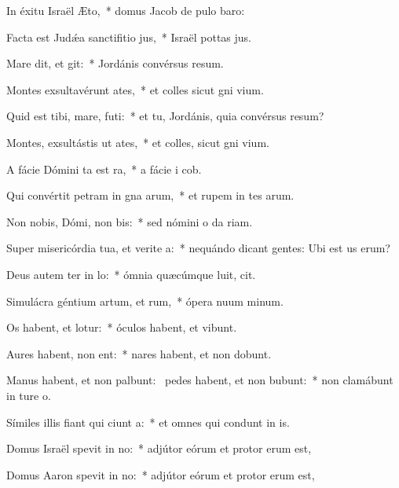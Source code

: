 \item In éxitu Israël  Æto,~* domus Jacob de pulo baro:
\item Facta est Judǽa sanctifitio jus,~* Israël pottas jus.
\item Mare dit, et git:~* Jordánis convérsus  resum.
\item Montes exsultavérunt  ates,~* et colles sicut gni vium.
\item Quid est tibi, mare,  futi:~* et tu, Jordánis, quia convérsus  resum?
\item Montes, exsultástis ut ates,~* et colles, sicut gni vium.
\item A fácie Dómini ta est ra,~* a fácie i cob.
\item Qui convértit petram in gna arum,~* et rupem in tes arum.
\item Non nobis, Dómi, non bis:~* sed nómini o da riam.
\item Super misericórdia tua, et verite a:~* nequándo dicant gentes: Ubi est us erum?
\item Deus autem ter in lo:~* ómnia quæcúmque luit, cit.
\item Simulácra géntium artum, et rum,~* ópera nuum minum.
\item Os habent, et  lotur:~* óculos habent, et  vibunt.
\item Aures habent,  non ent:~* nares habent, et non dobunt.
\item Manus habent, et non palbunt:~\pscross{} pedes habent, et non bubunt:~* non clamábunt in ture o.
\item Símiles illis fiant qui ciunt a:~* et omnes qui condunt in is.
\item Domus Israël spevit in no:~* adjútor eórum et protor erum est,
\item Domus Aaron spevit in no:~* adjútor eórum et protor erum est,

